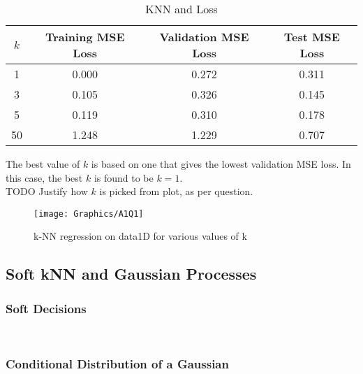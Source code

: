 \documentclass[a4paper,12pt]{article}
\begin{document}
\begin{table}[ht]
\centering %
\begin{tabular}{c c c c} %
\hline %
$k$ & Training MSE Loss & Validation MSE Loss & Test MSE Loss \\ [0.5ex] 
\hline
1 & 0.000  & 0.272 & 0.311 \\
3 & 0.105  & 0.326 & 0.145 \\
5 & 0.119  & 0.310 & 0.178 \\
50 & 1.248 & 1.229 & 0.707 \\ [1ex] %
\hline %
\end{tabular}
\caption{KNN and Loss} %
\label{table:KLoss} %
\end{table}

The best value of $k$ is based on one that gives the lowest validation MSE loss. In this case, the best $k$ is found to be $k = 1$. \\
TODO Justify how $k$ is picked from plot, as per question.

\begin{figure}[!htb]
	\centering
	\texttt{[image: Graphics/A1Q1]}
    \caption{\label{figure:kNN} k-NN regression on data1D for various values of k}
\end{figure}

\clearpage

\subsection{Soft kNN and Gaussian Processes}
\subsubsection{Soft Decisions}
\begin{verbatim}


\end{verbatim}
\subsubsection{Conditional Distribution of a Gaussian}
\end{document}
